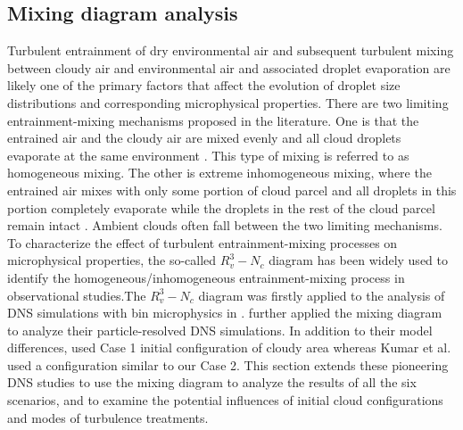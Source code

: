 \documentclass[draft,linenumbers]{agujournal}
\begin{document}
\subsection{Mixing diagram analysis}
Turbulent entrainment of dry environmental air and subsequent turbulent mixing between cloudy air and environmental air and associated droplet evaporation are likely one of the primary factors that affect the evolution of droplet size distributions and corresponding microphysical properties. There are two limiting entrainment-mixing mechanisms proposed in the literature. One is that the entrained air and the cloudy air are mixed evenly and all cloud droplets evaporate at the same environment \citep{Warner1973}. This type of mixing is referred to as homogeneous mixing. The other is extreme inhomogeneous mixing, where the entrained air mixes with only some portion of cloud parcel and all droplets in this portion completely evaporate while the droplets in the rest of the cloud parcel remain intact \citep{Baker1980}. Ambient clouds often fall between the two limiting mechanisms. To characterize the effect of turbulent entrainment-mixing processes on microphysical properties, the {\color{green}so-called $R_v^3-N_c$ diagram \citep{Jensen1985, Burnet2007Observational} has been widely used} to identify the homogeneous/inhomogeneous entrainment-mixing process in observational studies.{\color{green}The $R_v^3-N_c$ diagram was firstly applied to the analysis of DNS simulations with bin microphysics in \citet{And04, And06, And09}.} \citet{Kumar14} further applied the mixing diagram to analyze their particle-resolved DNS simulations. In addition to their model differences,  \citet{And04, And06, And09} used Case 1 initial configuration of cloudy area whereas Kumar et al. used a configuration similar to our Case 2. {\color{green}This section extends these pioneering DNS studies to use the mixing diagram to analyze the results of all the six scenarios, and to examine the potential influences of initial cloud configurations and modes of turbulence treatments.}
\end{document}
